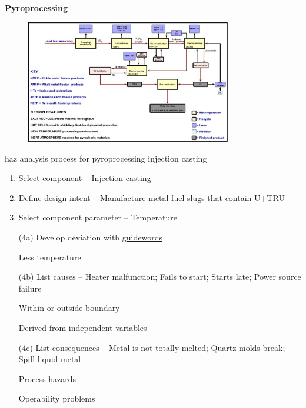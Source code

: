\documentclass[aspectratio=1610,pdftex,dvipsnames,compress,xcolor={dvipsnames}]{beamer}
\newcommand{\acs}{\acrshort} %
\begin{document}
\begin{frame}[plain]{}
    \centering\LARGE\textbf{Pyroprocessing}
\end{frame}


\addtocounter{framenumber}{-1}
\begin{frame}{}
    \begin{figure}
        \centering
        \includegraphics[width=0.80\textwidth]{pyroprocessing.flowsheet.jpg}
    \end{figure}
\end{frame}


\begin{frame}{\acs{haz} analysis process for pyroprocessing injection casting}
    \begin{enumerate}[series=outerlist,topsep=0pt,itemsep=1pt,leftmargin=*,label=(\arabic*)]
        \item Select component -- Injection casting
            \vspace{0.05in}
        \item Define design intent -- Manufacture metal fuel slugs that contain U+TRU
            \vspace{0.05in}
        \item Select component parameter -- Temperature
            \vspace{0.05in}
        \item[(4a)] Develop deviation with \href{https://uidaho.pressbooks.pub/riskassessment/chapter/hazop/}{guidewords}
        \item[]Less temperature
            \vspace{0.05in}
        \item[(4b)] List causes -- Heater malfunction; Fails to start; Starts late; Power source failure
        \item[]Within or outside boundary  
        \item[]Derived from independent variables
            \vspace{0.05in}
        \item[(4c)] List consequences -- Metal is not totally melted; Quartz molds break; Spill liquid metal 
        \item[] Process hazards  
        \item[] Operability problems 
    \end{enumerate}
\end{frame}
\end{document}
